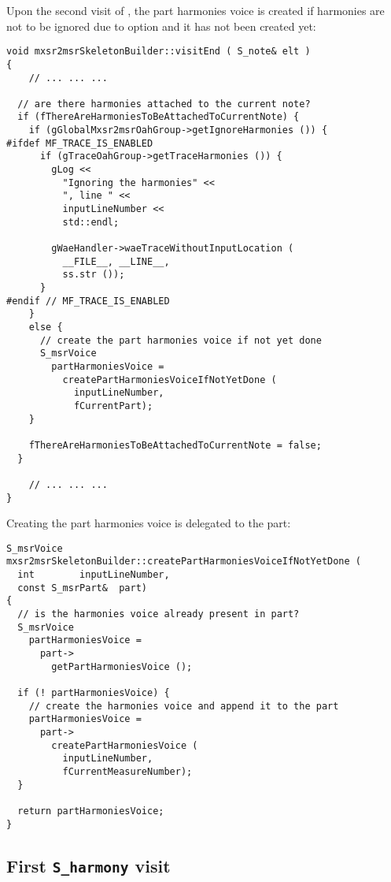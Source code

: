 Upon the second visit of , the part harmonies voice is created if harmonies are not to be ignored due to option  and it has not been created yet:
\begin{lstlisting}[language=CPlusPlus]
void mxsr2msrSkeletonBuilder::visitEnd ( S_note& elt )
{
	// ... ... ...

  // are there harmonies attached to the current note?
  if (fThereAreHarmoniesToBeAttachedToCurrentNote) {
    if (gGlobalMxsr2msrOahGroup->getIgnoreHarmonies ()) {
#ifdef MF_TRACE_IS_ENABLED
      if (gTraceOahGroup->getTraceHarmonies ()) {
        gLog <<
          "Ignoring the harmonies" <<
          ", line " <<
          inputLineNumber <<
          std::endl;

        gWaeHandler->waeTraceWithoutInputLocation (
          __FILE__, __LINE__,
          ss.str ());
      }
#endif // MF_TRACE_IS_ENABLED
    }
    else {
      // create the part harmonies voice if not yet done
      S_msrVoice
        partHarmoniesVoice =
          createPartHarmoniesVoiceIfNotYetDone (
            inputLineNumber,
            fCurrentPart);
    }

    fThereAreHarmoniesToBeAttachedToCurrentNote = false;
  }

	// ... ... ...
}
\end{lstlisting}

Creating the part harmonies voice is delegated to the part:
\begin{lstlisting}[language=CPlusPlus]
S_msrVoice mxsr2msrSkeletonBuilder::createPartHarmoniesVoiceIfNotYetDone (
  int        inputLineNumber,
  const S_msrPart&  part)
{
  // is the harmonies voice already present in part?
  S_msrVoice
    partHarmoniesVoice =
      part->
        getPartHarmoniesVoice ();

  if (! partHarmoniesVoice) {
    // create the harmonies voice and append it to the part
    partHarmoniesVoice =
      part->
        createPartHarmoniesVoice (
          inputLineNumber,
          fCurrentMeasureNumber);
  }

  return partHarmoniesVoice;
}
\end{lstlisting}


\subsection{First {\tt S_harmony} visit}

